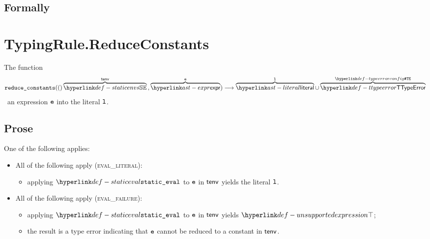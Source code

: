 \subsection{Formally}


\section{TypingRule.ReduceConstants \label{sec:TypingRule.ReduceConstants}}
\hypertarget{def-reduceconstants}{}
The function
\[
\reduceconstants(\overname{\staticenvs}{\tenv} \aslsep \overname{\expr}{\ve})
\aslto
\overname{\literal}{\vl} \cup \overname{\TTypeError}{\TypeErrorConfig}
\]
\symbolicallysimplifies\ an expression $\texttt{e}$ into the literal $\texttt{l}$.
\ProseOtherwiseTypeError

\subsection{Prose}
One of the following applies:
\begin{itemize}
  \item All of the following apply (\textsc{eval\_literal}):
  \begin{itemize}
    \item applying $\staticeval$ to $\texttt{e}$ in $\textsf{tenv}$ yields the literal $\texttt{l}$\ProseOrTypeError.
  \end{itemize}

  \item All of the following apply (\textsc{eval\_failure}):
  \begin{itemize}
    \item applying $\staticeval$ to $\texttt{e}$ in $\textsf{tenv}$ yields $\CannotBeTransformed$;
    \item the result is a type error indicating that $\texttt{e}$ cannot be reduced to a constant in $\textsf{tenv}$.
  \end{itemize}
\end{itemize}

